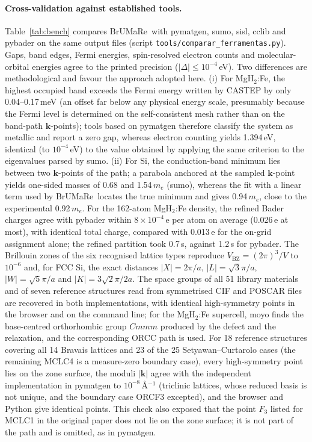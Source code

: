 \documentclass[11pt,a4paper]{article}
\newcommand{\code}[1]{\texttt{#1}}
\newcommand{\BMR}{\textsf{BrUMa\textcolor[HTML]{B26B00}{Re}}}
\begin{document}
\paragraph{Cross-validation against established tools.} Table~\ref{tab:bench} compares \BMR\ with pymatgen, sumo, sisl, cclib and pybader on the same output files (script \code{tools/comparar\_ferramentas.py}). Gaps, band edges, Fermi energies, spin-resolved electron counts and molecular-orbital energies agree to the printed precision ($|\Delta|\le10^{-4}$\,eV). Two differences are methodological and favour the approach adopted here. (i) For MgH$_2$:Fe, the highest occupied band exceeds the Fermi energy written by CASTEP by only 0.04--0.17\,meV (an offset far below any physical energy scale, presumably because the Fermi level is determined on the self-consistent mesh rather than on the band-path $\bm k$-points); tools based on pymatgen therefore classify the system as metallic and report a zero gap, whereas electron counting yields 1.394\,eV, identical (to $10^{-4}$\,eV) to the value obtained by applying the same criterion to the eigenvalues parsed by sumo. (ii) For Si, the conduction-band minimum lies between two $\mathbf{k}$-points of the path; a parabola anchored at the sampled $\mathbf{k}$-point yields one-sided masses of 0.68 and 1.54\,$m_e$ (sumo), whereas the fit with a linear term used by \BMR\ locates the true minimum and gives 0.94\,$m_e$, close to the experimental 0.92\,$m_e$. For the 162-atom MgH$_2$:Fe density, the refined Bader charges agree with pybader within $8\times10^{-4}$\,e per atom on average (0.026\,e at most), with identical total charge, compared with 0.013\,e for the on-grid assignment alone; the refined partition took 0.7\,s, against 1.2\,s for pybader. The Brillouin zones of the six recognised lattice types reproduce $V_\mathrm{BZ}=(2\pi)^3/V$ to $10^{-6}$ and, for FCC Si, the exact distances $|X|=2\pi/a$, $|L|=\sqrt3\pi/a$, $|W|=\sqrt5\pi/a$ and $|K|=3\sqrt2\pi/2a$. The space groups of all 51 library materials and of seven reference structures read from symmetrised CIF and POSCAR files are recovered in both implementations, with identical high-symmetry points in the browser and on the command line; for the MgH$_2$:Fe supercell, moyo finds the base-centred orthorhombic group $Cmmm$ produced by the defect and the relaxation, and the corresponding ORCC path is used. For 18 reference structures covering all 14 Bravais lattices and 23 of the 25 Setyawan--Curtarolo cases (the remaining MCLC4 is a measure-zero boundary case), every high-symmetry point lies on the zone surface, the moduli $|\bm k|$ agree with the independent implementation in pymatgen \cite{ong2013pymatgen} to $10^{-8}$\,\AA$^{-1}$ (triclinic lattices, whose reduced basis is not unique, and the boundary case ORCF3 excepted), and the browser and Python give identical points. This check also exposed that the point $F_3$ listed for MCLC1 in the original paper does not lie on the zone surface; it is not part of the path and is omitted, as in pymatgen.
\end{document}
